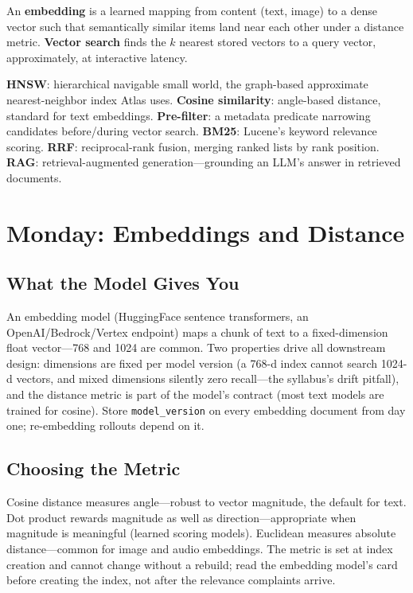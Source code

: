\begin{definitionbox}
An \textbf{embedding} is a learned mapping from content (text, image) to a dense vector such that semantically similar items land near each other under a distance metric. \textbf{Vector search} finds the $k$ nearest stored vectors to a query vector, approximately, at interactive latency.
\end{definitionbox}

\begin{keyterms}
\textbf{HNSW}: hierarchical navigable small world, the graph-based approximate nearest-neighbor index Atlas uses. \textbf{Cosine similarity}: angle-based distance, standard for text embeddings. \textbf{Pre-filter}: a metadata predicate narrowing candidates before/during vector search. \textbf{BM25}: Lucene's keyword relevance scoring. \textbf{RRF}: reciprocal-rank fusion, merging ranked lists by rank position. \textbf{RAG}: retrieval-augmented generation---grounding an LLM's answer in retrieved documents.
\end{keyterms}

\section{Monday: Embeddings and Distance}
\subsection{What the Model Gives You}
An embedding model (HuggingFace sentence transformers, an OpenAI/Bedrock/Vertex endpoint) maps a chunk of text to a fixed-dimension float vector---768 and 1024 are common. Two properties drive all downstream design: dimensions are fixed per model version (a 768-d index cannot search 1024-d vectors, and mixed dimensions silently zero recall---the syllabus's drift pitfall), and the distance metric is part of the model's contract (most text models are trained for cosine). Store \texttt{model\_version} on every embedding document from day one; re-embedding rollouts depend on it.

\subsection{Choosing the Metric}
Cosine distance measures angle---robust to vector magnitude, the default for text. Dot product rewards magnitude as well as direction---appropriate when magnitude is meaningful (learned scoring models). Euclidean measures absolute distance---common for image and audio embeddings. The metric is set at index creation and cannot change without a rebuild; read the embedding model's card before creating the index, not after the relevance complaints arrive.

